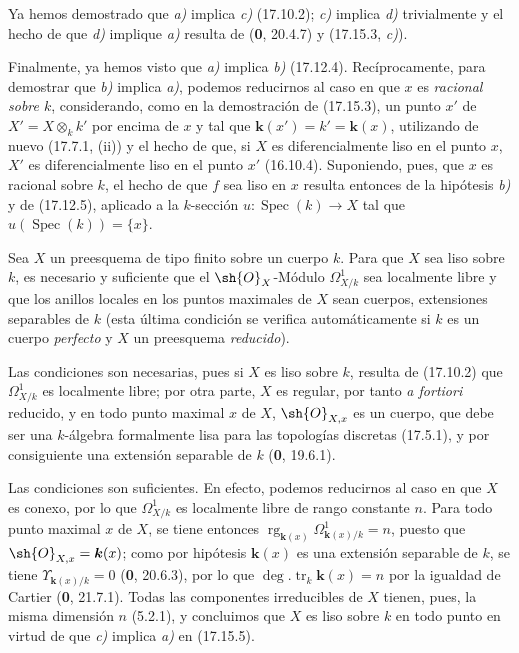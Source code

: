 Ya hemos demostrado que \emph{a)} implica \emph{c)} (17.10.2); \emph{c)} implica \emph{d)} trivialmente y el hecho de que \emph{d)} implique \emph{a)} resulta de (\textbf 0, 20.4.7) y (17.15.3, \emph{c)}).

Finalmente, ya hemos visto que \emph{a)} implica \emph{b)} (17.12.4). Recíprocamente, para demostrar que \emph{b)} implica \emph{a)}, podemos reducirnos al caso en que $x$ es \emph{racional sobre $k$}, considerando, como en la demostración de (17.15.3), un punto $x'$ de $X'=X\otimes_k k'$ por encima de $x$ y tal que $\boldsymbol k(x')=k'=\boldsymbol k(x)$, utilizando de nuevo (17.7.1, (ii)) y el hecho de que, si $X$ es diferencialmente liso en el punto $x$, $X'$ es diferencialmente liso en el punto $x'$ (16.10.4). Suponiendo, pues, que $x$ es racional sobre $k$, el hecho de que $f$ sea liso en $x$ resulta entonces de la hipótesis \emph{b)} y de (17.12.5), aplicado a la $k$-sección $u:\operatorname{Spec}(k)\to X$ tal que $u(\operatorname{Spec}(k))=\{x\}$.

\begin{corollary}[17.15.6]
\label{IV.17.15.6}
Sea $X$ un preesquema de tipo finito sobre un cuerpo $k$. Para que $X$ sea liso sobre $k$, es necesario y suficiente que el $\sh{O}_X$-Módulo $\varOmega^1_{X/k}$ sea localmente libre y que los anillos locales en los puntos maximales de $X$ sean cuerpos, extensiones separables de $k$ \textup{(esta última condición se verifica automáticamente si $k$ es un cuerpo \emph{perfecto} y $X$ un preesquema \emph{reducido})}.
\end{corollary}

Las condiciones son necesarias, pues si $X$ es liso sobre $k$, resulta de (17.10.2) que $\varOmega^1_{X/k}$ es localmente libre; por otra parte, $X$ es regular, por tanto \emph{a fortiori} reducido, y en todo punto maximal $x$ de $X$, $\sh{O}_{X,x}$ es un cuerpo, que debe ser una $k$-álgebra formalmente lisa para las topologías discretas (17.5.1), y por consiguiente una extensión separable de $k$ (\textbf 0, 19.6.1).

Las condiciones son suficientes. En efecto, podemos reducirnos al caso en que $X$ es conexo, por lo que $\varOmega^1_{X/k}$ es localmente libre de rango constante $n$. Para todo punto maximal $x$ de $X$, se tiene entonces $\operatorname{rg}_{\mathbf k(x)}\Omega^1_{\mathbf k(x)/k}=n$, puesto que $\sh{O}_{X,x}=\boldsymbol k(x)$; como por hipótesis $\boldsymbol k(x)$ es una extensión separable de $k$, se tiene $\Upsilon_{\mathbf k(x)/k}=0$ (\textbf 0, 20.6.3), por lo que $\deg.\operatorname{tr}_k \boldsymbol k(x)=n$ por la igualdad de Cartier (\textbf 0, 21.7.1). Todas las componentes irreducibles de $X$ tienen, pues, la misma dimensión $n$ (5.2.1), y concluimos que $X$ es liso sobre $k$ en todo punto en virtud de que \emph{c)} implica \emph{a)} en (17.15.5).

